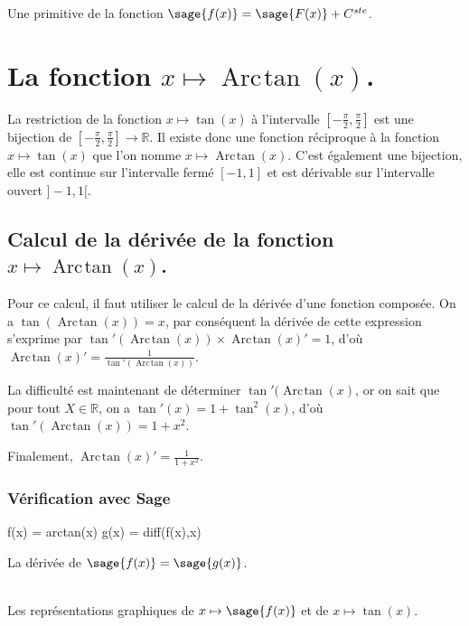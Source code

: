 \documentclass[a4paper,12pt]{report}
\def\eclaire{\mathbb}
\def\R{\ensuremath{\eclaire R}}
\renewcommand{\arctan}{\mathop{\mathrm{Arc\mspace{2mu}tan}}}
\begin{document}
Une primitive de la fonction $\sage{f(x)} = \sage{F(x)} + C^{ste}$.


\section{La fonction  $x \mapsto \arctan(x) $.}


La restriction de la fonction $x \mapsto \tan(x) $ à l'intervalle $\left[-\frac{\pi}{2},\frac{\pi}{2}\right]$ est une bijection de $\left[-\frac{\pi}{2},\frac{\pi}{2}\right] \rightarrow \R $. Il existe donc une fonction réciproque à la fonction $x \mapsto \tan(x) $ que l'on nomme $x \mapsto \arctan(x) $. C'est également une bijection, elle est continue sur l'intervalle fermé  $ [-1,1]$ et est dérivable sur l'intervalle ouvert $]-1,1[$.


\subsection{Calcul de la dérivée de la fonction $x \mapsto \arctan(x) $.}


Pour ce calcul, il faut utiliser le calcul de la dérivée d'une fonction composée. On a $\tan(\arctan(x))=x$, par conséquent la dérivée de cette expression s'exprime par $ \tan'(\arctan(x)) \times \arctan(x)' = 1$, d'où $\arctan(x)' = \frac{1}{\tan'(\arctan(x))} $.

La difficulté est maintenant de déterminer $\tan'(\arctan(x)$, or on sait que pour tout $X \in \R$, on a $ \tan'(x) =1+\tan^2(x) $, d'où $\tan'(\arctan(x)) = 1+x^2$.

Finalement, $\arctan(x)' = \frac{1}{1+x^2}$.

\subsubsection*{Vérification avec Sage}

\begin{sageblock}
    f(x) = arctan(x)
    g(x) = diff(f(x),x)
\end{sageblock}

La dérivée de $\sage{f(x)} = \sage{g(x)} $.


\begin{center}
\\
Les représentations graphiques de $x \mapsto \sage{f(x)} $ et de $x\mapsto \tan(x)$.
\end{center}
\end{document}
